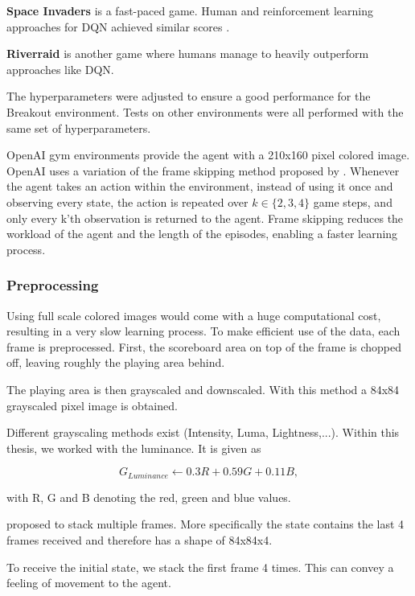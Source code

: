 \textbf{Space Invaders} is a fast-paced game. Human and reinforcement learning approaches for DQN achieved similar scores \citep{nature}.

\textbf{Riverraid} is another game where humans manage to heavily outperform approaches like DQN.

The hyperparameters were adjusted to ensure a good performance for the Breakout environment. Tests on other environments were all performed with the same set of hyperparameters.


OpenAI gym environments provide the agent with a 210x160 pixel colored image. \linebreak
OpenAI uses a variation of the frame skipping method proposed by \citet{nature}.
Whenever the agent takes an action within the environment, instead of using it once and observing every state, the action is repeated over $k \in \{2,3,4\}$ game steps, and only every k'th observation is returned to the agent. Frame skipping reduces the workload of the agent and the length of the episodes, enabling a faster learning process.


\subsubsection{Preprocessing}
Using full scale colored images would come with a huge computational cost, resulting in a very slow learning process.
To make efficient use of the data, each frame is preprocessed.
First, the scoreboard area on top of the frame is chopped off, leaving roughly the playing area behind.

The playing area is then grayscaled and downscaled. With this method a 84x84 grayscaled pixel image is obtained.

Different grayscaling methods exist (Intensity, Luma, Lightness,...). Within this thesis, we worked with the luminance. It is given as

\begin{equation}
G_{Luminance} \gets 0.3 R + 0.59 G + 0.11 B,
\end{equation}

with R, G and B denoting the red, green and blue values.

\citet{nature} proposed to stack multiple frames. More specifically the state contains the last 4 frames received and therefore has a shape of 84x84x4.

To receive the initial state, we stack the first frame 4 times.
This can convey a feeling of movement to the agent.

